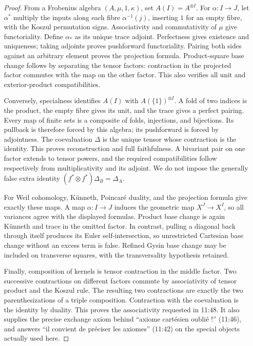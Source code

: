 \begin{proof}
From a Frobenius algebra $(A,\mu,1,\kappa)$, set $A(I)=A^{\otimes I}$. For $\alpha:I\to J$, let $\alpha^*$ multiply the inputs along each fibre $\alpha^{-1}(j)$, inserting $1$ for an empty fibre, with the Koszul permutation signs. Associativity and commutativity of $\mu$ give functoriality. Define $\alpha_*$ as its unique trace adjoint. Perfectness gives existence and uniqueness; taking adjoints proves pushforward functoriality. Pairing both sides against an arbitrary element proves the projection formula. Product-square base change follows by separating the tensor factors: contraction in the projected factor commutes with the map on the other factor. This also verifies all unit and exterior-product compatibilities.

Conversely, specialness identifies $A(I)$ with $A(\{1\})^{\otimes I}$. A fold of two indices is the product, the empty fibre gives its unit, and the trace gives a perfect pairing. Every map of finite sets is a composite of folds, injections, and bijections. Its pullback is therefore forced by this algebra; its pushforward is forced by adjointness. The coevaluation $\Delta$ is the unique tensor whose contraction is the identity. This proves reconstruction and full faithfulness. A bivariant pair on one factor extends to tensor powers, and the required compatibilities follow respectively from multiplicativity and its adjoint. We do not impose the generally false extra identity $(f^*\otimes f^*)\Delta_B=\Delta_A$.

For Weil cohomology, K\"unneth, Poincar\'e duality, and the projection formula give exactly these maps. A map $\alpha:I\to J$ induces the geometric map $X^J\to X^I$, so all variances agree with the displayed formulas. Product base change is again K\"unneth and trace in the omitted factor. In contrast, pulling a diagonal back through itself produces its Euler self-intersection, so unrestricted Cartesian base change without an excess term is false. Refined Gysin base change may be included on transverse squares, with the transversality hypothesis retained.

Finally, composition of kernels is tensor contraction in the middle factor. Two successive contractions on different factors commute by associativity of tensor product and the Koszul rule. The resulting two contractions are exactly the two parenthesizations of a triple composition. Contraction with the coevaluation is the identity by duality. This proves the associativity requested in 11:48. It also supplies the precise exchange axiom behind ``axiome cart\'esien oubli\'e !'' (11:46), and answers ``il convient de pr\'eciser les axiomes'' (11:42) on the special objects actually used here.
\end{proof}

